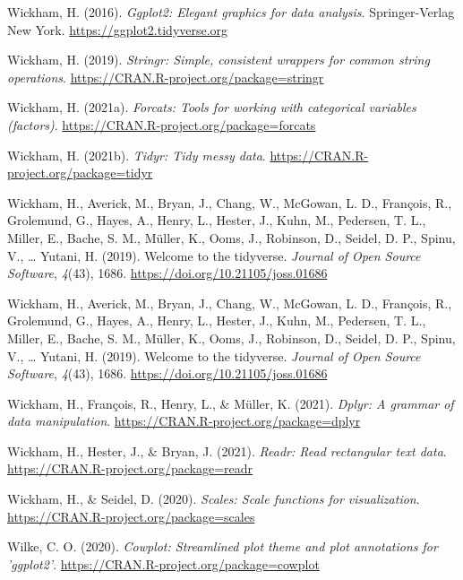 \documentclass[
  english,
  man,floatsintext]{apa7}
\begin{document}
\leavevmode\hypertarget{ref-R-ggplot2}{}%
Wickham, H. (2016). \emph{Ggplot2: Elegant graphics for data analysis}. Springer-Verlag New York. \url{https://ggplot2.tidyverse.org}

\leavevmode\hypertarget{ref-R-stringr}{}%
Wickham, H. (2019). \emph{Stringr: Simple, consistent wrappers for common string operations}. \url{https://CRAN.R-project.org/package=stringr}

\leavevmode\hypertarget{ref-R-forcats}{}%
Wickham, H. (2021a). \emph{Forcats: Tools for working with categorical variables (factors)}. \url{https://CRAN.R-project.org/package=forcats}

\leavevmode\hypertarget{ref-R-tidyr}{}%
Wickham, H. (2021b). \emph{Tidyr: Tidy messy data}. \url{https://CRAN.R-project.org/package=tidyr}

\leavevmode\hypertarget{ref-tidyverse2019}{}%
Wickham, H., Averick, M., Bryan, J., Chang, W., McGowan, L. D., François, R., Grolemund, G., Hayes, A., Henry, L., Hester, J., Kuhn, M., Pedersen, T. L., Miller, E., Bache, S. M., Müller, K., Ooms, J., Robinson, D., Seidel, D. P., Spinu, V., \ldots{} Yutani, H. (2019). Welcome to the tidyverse. \emph{Journal of Open Source Software}, \emph{4}(43), 1686. \url{https://doi.org/10.21105/joss.01686}

\leavevmode\hypertarget{ref-R-tidyverse}{}%
Wickham, H., Averick, M., Bryan, J., Chang, W., McGowan, L. D., François, R., Grolemund, G., Hayes, A., Henry, L., Hester, J., Kuhn, M., Pedersen, T. L., Miller, E., Bache, S. M., Müller, K., Ooms, J., Robinson, D., Seidel, D. P., Spinu, V., \ldots{} Yutani, H. (2019). Welcome to the tidyverse. \emph{Journal of Open Source Software}, \emph{4}(43), 1686. \url{https://doi.org/10.21105/joss.01686}

\leavevmode\hypertarget{ref-R-dplyr}{}%
Wickham, H., François, R., Henry, L., \& Müller, K. (2021). \emph{Dplyr: A grammar of data manipulation}. \url{https://CRAN.R-project.org/package=dplyr}

\leavevmode\hypertarget{ref-R-readr}{}%
Wickham, H., Hester, J., \& Bryan, J. (2021). \emph{Readr: Read rectangular text data}. \url{https://CRAN.R-project.org/package=readr}

\leavevmode\hypertarget{ref-R-scales}{}%
Wickham, H., \& Seidel, D. (2020). \emph{Scales: Scale functions for visualization}. \url{https://CRAN.R-project.org/package=scales}

\leavevmode\hypertarget{ref-R-cowplot}{}%
Wilke, C. O. (2020). \emph{Cowplot: Streamlined plot theme and plot annotations for 'ggplot2'}. \url{https://CRAN.R-project.org/package=cowplot}
\end{document}
